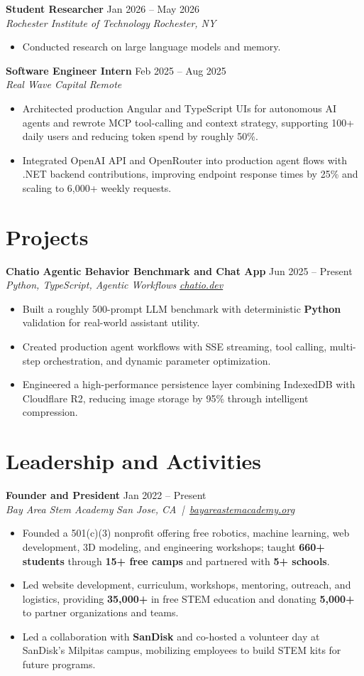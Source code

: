 \documentclass[10pt,letterpaper]{article}
\newif\ifresumeFirstRole
\newcommand{\resumeRole}[4]{%
  \ifresumeFirstRole
    \global\resumeFirstRolefalse
  \else
    \vspace{0pt plus 1fill}%
  \fi
  \textbf{#1} \hfill #2\\
  \textit{#3} \hfill \textit{#4}
}
\begin{document}
\resumeRole{Student Researcher}{Jan 2026 -- May 2026}{Rochester Institute of Technology}{Rochester, NY}
\begin{itemize}
  \item Conducted research on large language models and memory.
\end{itemize}

\resumeRole{Software Engineer Intern}{Feb 2025 -- Aug 2025}{Real Wave Capital}{Remote}
\begin{itemize}
  \item Architected production Angular and TypeScript UIs for autonomous AI agents and rewrote MCP tool-calling and context strategy, supporting 100+ daily users and reducing token spend by roughly 50\%.
  \item Integrated OpenAI API and OpenRouter into production agent flows with .NET backend contributions, improving endpoint response times by 25\% and scaling to 6,000+ weekly requests.
\end{itemize}

\section*{Projects}
\resumeRole{Chatio Agentic Behavior Benchmark and Chat App}{Jun 2025 -- Present}{Python, TypeScript, Agentic Workflows}{\href{https://chatio.dev}{chatio.dev}}
\begin{itemize}
  \item Built a roughly 500-prompt LLM benchmark with deterministic \textbf{Python} validation for real-world assistant utility.
  \item Created production agent workflows with SSE streaming, tool calling, multi-step orchestration, and dynamic parameter optimization.
  \item Engineered a high-performance persistence layer combining IndexedDB with Cloudflare R2, reducing image storage by 95\% through intelligent compression.
\end{itemize}

\section*{Leadership and Activities}
\resumeRole{Founder and President}{Jan 2022 -- Present}{Bay Area Stem Academy}{San Jose, CA \,|\, \href{https://bayareastemacademy.org}{bayareastemacademy.org}}
\begin{itemize}
  \item Founded a 501(c)(3) nonprofit offering free robotics, machine learning, web development, 3D modeling, and engineering workshops; taught \textbf{660+ students} through \textbf{15+ free camps} and partnered with \textbf{5+ schools}.
  \item Led website development, curriculum, workshops, mentoring, outreach, and logistics, providing \textbf{\textdollar{}35,000+} in free STEM education and donating \textbf{\textdollar{}5,000+} to partner organizations and teams.
  \item Led a collaboration with \textbf{SanDisk} and co-hosted a volunteer day at SanDisk's Milpitas campus, mobilizing employees to build STEM kits for future programs.
\end{itemize}
\end{document}
